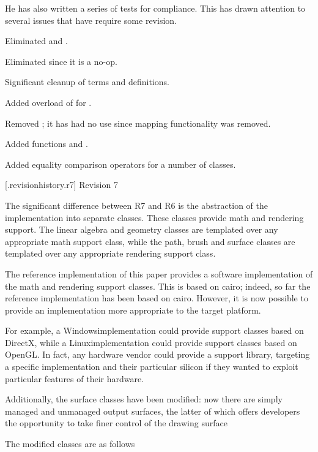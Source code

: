 \pnum
He has also written a series of tests for compliance. This has drawn attention to several issues that have require some revision.

\pnum
Eliminated  and .

\pnum
Eliminated  since it is a no-op.

\pnum
Significant cleanup of terms and definitions.

\pnum
Added overload of  for .

\pnum
Removed ; it has had no use since mapping functionality was removed.

\pnum
Added functions  and .

\pnum
Added equality comparison operators for a number of classes.

 [\iotwod.revisionhistory.r7] {Revision 7}

\pnum
The significant difference between R7 and R6 is the abstraction of the implementation into separate classes. These classes provide math and rendering support. The linear algebra and geometry classes are templated over any appropriate math support class, while the path, brush and surface classes are templated over any appropriate rendering support class.

\pnum
The reference implementation of this paper provides a software implementation of the math and rendering support classes. This is based on cairo; indeed, so far the reference implementation has been based on cairo. However, it is now possible to provide an implementation more appropriate to the target platform.

\pnum
For example, a Windows\textregistered implementation could provide support classes based on DirectX\textregistered, while a Linux\textregistered implementation could provide support classes based on OpenGL\textregistered. In fact, any hardware vendor could provide a support library, targeting a specific implementation and their particular silicon if they wanted to exploit particular features of their hardware.

\pnum
Additionally, the surface classes have been modified: now there are simply managed and unmanaged output surfaces, the latter of which offers developers the opportunity to take finer control of the drawing surface

\pnum
The modified classes are as follows

